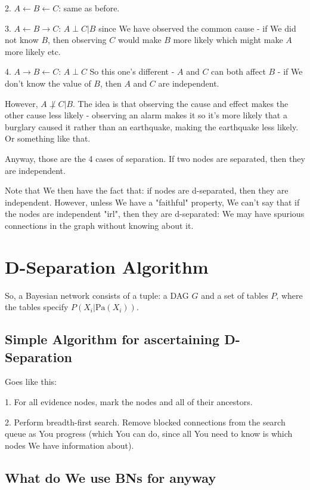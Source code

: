 \documentclass{article}
\begin{document}
		2. $A \leftarrow B \leftarrow C$: same as before.
		
		3. $A\leftarrow B \to C$: $A\perp C | B$ since We have observed the common cause - if We did not know $B$, then observing $C$ would make $B$ more likely which might make $A$ more likely etc.
		
		4. $A \to B \leftarrow C$: $A \perp C$ So this one's different - $A$ and $C$ can both affect $B$ - if We don't know the value of $B$, then $A$ and $C$ are independent.
		
		However, $A\not\perp C | B$. The idea is that observing the cause and effect makes the other cause less likely - observing an alarm makes it so it's more likely that a burglary caused it rather than an earthquake, making the earthquake less likely. Or something like that.
		
		Anyway, those are the 4 cases of separation. If two nodes are separated, then they are independent.
		
		Note that We then have the fact that: if nodes are d-separated, then they are independent. However, unless We have a "faithful" property, We can't say that if the nodes are independent "irl", then they are d-separated: We may have spurious connections in the graph without knowing about it.
		
		
\newpage
\section{D-Separation Algorithm}

	So, a Bayesian network consists of a tuple: a DAG $G$ and a set of tables $P$, where the tables specify $P(X_i|\text{Pa}(X_i))$.
	
	\subsection{Simple Algorithm for ascertaining D-Separation}
	
		Goes like this: 
		
		1. For all evidence nodes, mark the nodes and all of their ancestors.
		
		2. Perform breadth-first search. Remove blocked connections from the search queue as You progress (which You can do, since all You need to know is which nodes We have information about).
		
	\subsection{What do We use BNs for anyway}
	
\end{document}
